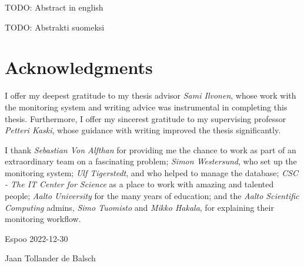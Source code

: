 \makecoverpage
\makecopyrightpage


\begin{abstractpage}[english]
TODO: Abstract in english
\end{abstractpage}



\begin{abstractpage}[finnish]
TODO: Abstrakti suomeksi
\end{abstractpage}


\section*{Acknowledgments}
I offer my deepest gratitude to my thesis advisor \emph{Sami Ilvonen}, whose work with the monitoring system and writing advice was instrumental in completing this thesis.
Furthermore, I offer my sincerest gratitude to my supervising professor \emph{Petteri Kaski}, whose guidance with writing improved the thesis significantly.

I thank \emph{Sebastian Von Alfthan} for providing me the chance to work as part of an extraordinary team on a fascinating problem; \emph{Simon Westersund}, who set up the monitoring system; \emph{Ulf Tigerstedt}, and who helped to manage the database;
\emph{CSC - The IT Center for Science} as a place to work with amazing and talented people; \emph{Aalto University} for the many years of education; and the \emph{Aalto Scientific Computing} admins, \emph{Simo Tuomisto} and \emph{Mikko Hakala}, for explaining their monitoring workflow.

\vspace{5cm}
Espoo 2022-12-30

\vspace{5mm}
{\hfill Jaan Tollander de Balsch \hspace{1cm}}

\newpage

\setcounter{tocdepth}{2}
\tableofcontents
